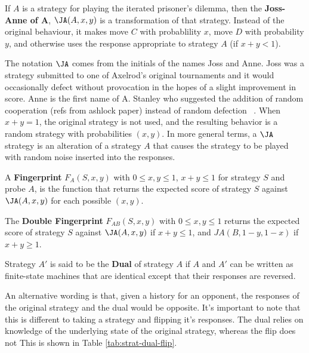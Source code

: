 \begin{definition}\label{def:joss-ann}
If $A$ is a strategy for playing the iterated prisoner's dilemma, then the \textbf{Joss-Anne of A}, $\JA(A, x, y)$ is a transformation of that strategy.
Instead of the original behaviour, it makes move $C$ with probablility $x$, move $D$ with probability $y$, and otherwise uses the response appropriate to strategy $A$ (if $x+y < 1$).
\end{definition}

The notation $\JA$ comes from the initials of the names Joss and Anne.
Joss was a strategy submitted to one of Axelrod’s original tournaments and it would occasionally defect without provocation in the hopes of a slight improvement in score.
Anne is the first name of A. Stanley who suggested the addition of random cooperation (refs from ashlock paper) instead of random defection ~\cite{Ashlock2008}.
When $x + y = 1$, the original strategy is not used, and the resulting behavior is a random strategy with probabilities $(x, y)$.
In more general terms, a $\JA$ strategy is an alteration of a strategy $A$ that causes the strategy to be played with random noise inserted into the responses.

\begin{definition}\label{def:fingerprint}
A \textbf{Fingerprint} $F_A(S, x, y)$ with $0 \leq x, y \leq 1$, $x+y \leq 1$ for strategy $S$ and probe $A$, is the function that returns the expected score of strategy $S$ against $\JA(A, x, y)$ for each possible $(x, y)$.
\end{definition}



\begin{definition}\label{def:double-fingerprint}
The \textbf{Double Fingerprint} $F_{AB}(S, x, y)$ with $0 \leq x, y \leq 1$ returns the expected score of strategy $S$ against $\JA(A, x, y)$ if $x+y \leq 1$, and $JA(B, 1-y, 1-x)$ if $x+y \geq 1$.
\end{definition}

\begin{definition}\label{def:dual}
Strategy $A'$ is said to be the \textbf{Dual} of strategy $A$ if $A$ and $A'$ can be written as finite-state machines that are identical except that their responses are reversed.
\end{definition}

An alternative wording is that, given a history for an opponent, the responses of the original strategy and the dual would be opposite.
It's important to note that this is different to taking a strategy and flipping it's responses.
The dual relies on knowledge of the underlying state of the original strategy, whereas the flip does not
This is shown in Table \ref{tab:strat-dual-flip}.

